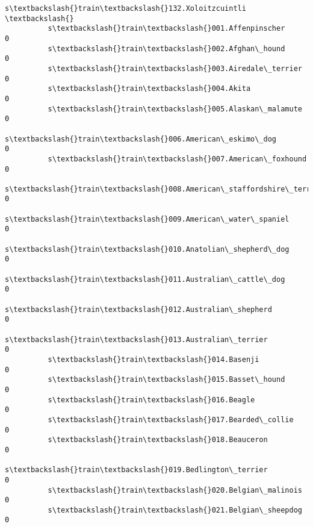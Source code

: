\documentclass[11pt]{article}
\begin{document}
\begin{Verbatim}[commandchars=\\\{\}]
                                                          s\textbackslash{}train\textbackslash{}132.Xoloitzcuintli  \textbackslash{}
          s\textbackslash{}train\textbackslash{}001.Affenpinscher                                                0   
          s\textbackslash{}train\textbackslash{}002.Afghan\_hound                                                 0   
          s\textbackslash{}train\textbackslash{}003.Airedale\_terrier                                             0   
          s\textbackslash{}train\textbackslash{}004.Akita                                                        0   
          s\textbackslash{}train\textbackslash{}005.Alaskan\_malamute                                             0   
          s\textbackslash{}train\textbackslash{}006.American\_eskimo\_dog                                          0   
          s\textbackslash{}train\textbackslash{}007.American\_foxhound                                            0   
          s\textbackslash{}train\textbackslash{}008.American\_staffordshire\_terrier                               0   
          s\textbackslash{}train\textbackslash{}009.American\_water\_spaniel                                       0   
          s\textbackslash{}train\textbackslash{}010.Anatolian\_shepherd\_dog                                       0   
          s\textbackslash{}train\textbackslash{}011.Australian\_cattle\_dog                                        0   
          s\textbackslash{}train\textbackslash{}012.Australian\_shepherd                                          0   
          s\textbackslash{}train\textbackslash{}013.Australian\_terrier                                           0   
          s\textbackslash{}train\textbackslash{}014.Basenji                                                      0   
          s\textbackslash{}train\textbackslash{}015.Basset\_hound                                                 0   
          s\textbackslash{}train\textbackslash{}016.Beagle                                                       0   
          s\textbackslash{}train\textbackslash{}017.Bearded\_collie                                               0   
          s\textbackslash{}train\textbackslash{}018.Beauceron                                                    0   
          s\textbackslash{}train\textbackslash{}019.Bedlington\_terrier                                           0   
          s\textbackslash{}train\textbackslash{}020.Belgian\_malinois                                             0   
          s\textbackslash{}train\textbackslash{}021.Belgian\_sheepdog                                             0   

\end{Verbatim}
\end{document}
